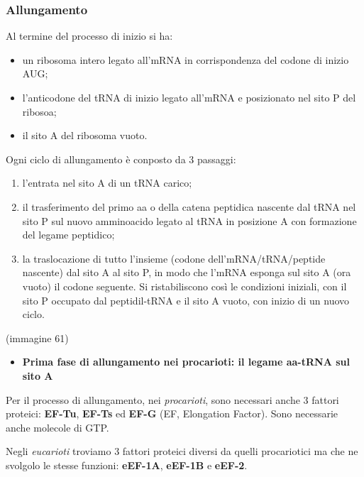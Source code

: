 \documentclass[]{article}
\begin{document}
\subsubsection{Allungamento}\label{allungamento}

Al termine del processo di inizio si ha:

\begin{itemize}
\itemsep1pt\parskip0pt
\item
  un ribosoma intero legato all'mRNA in corrispondenza del codone di
  inizio AUG;
\item
  l'anticodone del tRNA di inizio legato all'mRNA e posizionato nel sito
  P del ribosoa;
\item
  il sito A del ribosoma vuoto.
\end{itemize}

Ogni ciclo di allungamento è conposto da 3 passaggi:

\begin{enumerate}
\def\labelenumi{\arabic{enumi}.}
\itemsep1pt\parskip0pt
\item
  l'entrata nel sito A di un tRNA carico;
\item
  il trasferimento del primo aa o della catena peptidica nascente dal
  tRNA nel sito P sul nuovo amminoacido legato al tRNA in posizione A
  con formazione del legame peptidico;
\item
  la traslocazione di tutto l'insieme (codone dell'mRNA/tRNA/peptide
  nascente) dal sito A al sito P, in modo che l'mRNA esponga sul sito A
  (ora vuoto) il codone seguente. Si ristabiliscono così le condizioni
  iniziali, con il sito P occupato dal peptidil-tRNA e il sito A vuoto,
  con inizio di un nuovo ciclo.
\end{enumerate}

(immagine 61)

\begin{itemize}
\itemsep1pt\parskip0pt
\item
  \textbf{Prima fase di allungamento nei procarioti: il legame aa-tRNA
  sul sito A}
\end{itemize}

Per il processo di allungamento, nei \emph{procarioti}, sono necessari
anche 3 fattori proteici: \textbf{EF-Tu}, \textbf{EF-Ts} ed
\textbf{EF-G} (EF, Elongation Factor). Sono necessarie anche molecole di
GTP.

Negli \emph{eucarioti} troviamo 3 fattori proteici diversi da quelli
procariotici ma che ne svolgolo le stesse funzioni: \textbf{eEF-1A},
\textbf{eEF-1B} e \textbf{eEF-2}.
\end{document}
